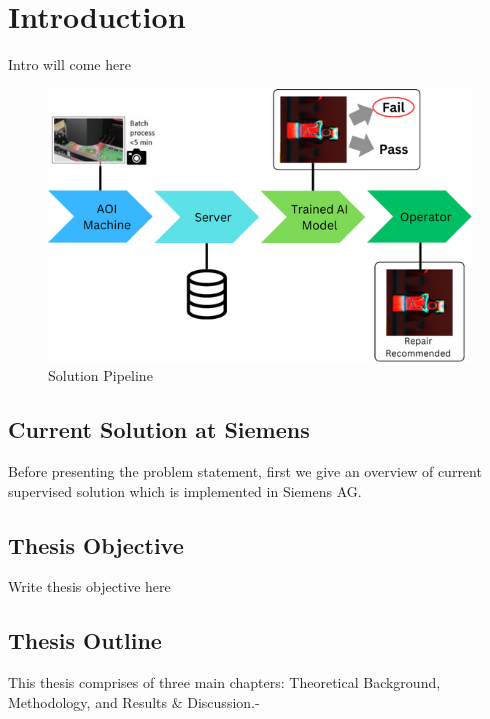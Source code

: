 \chapter{Introduction}
\label{sec:introduction}

Intro will come here

\begin{figure}[ht!]
    \centering
    \includegraphics[width=1\linewidth]{Images/Solution_Pipeline.png}
    \caption{Solution Pipeline}
    \label{fig:solution pipeline}
\end{figure}

\section{Current Solution at Siemens}
\label{subsec:current solution at siemens}

Before presenting the problem statement, first we give an overview of current supervised solution which is implemented in Siemens AG.

\section{Thesis Objective}

Write thesis objective here

\section{Thesis Outline}
This thesis comprises of three main chapters: Theoretical Background, Methodology, and Results \& Discussion.-